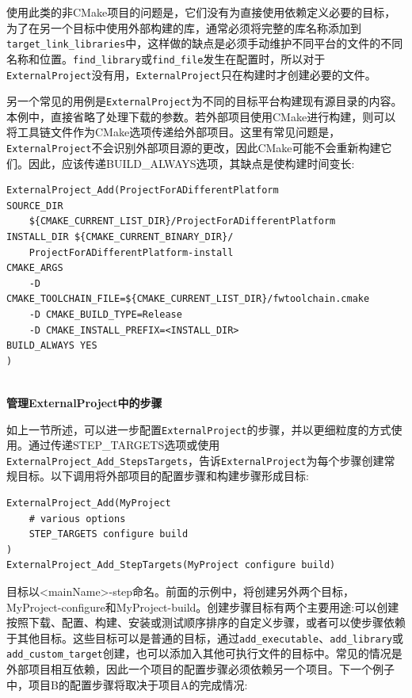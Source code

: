 使用此类的非CMake项目的问题是，它们没有为直接使用依赖定义必要的目标，为了在另一个目标中使用外部构建的库，通常必须将完整的库名称添加到\texttt{target\_link\_libraries}中，这样做的缺点是必须手动维护不同平台的文件的不同名称和位置。\texttt{find\_library}或\texttt{find\_file}发生在配置时，所以对于\texttt{ExternalProject}没有用，\texttt{ExternalProject}只在构建时才创建必要的文件。

另一个常见的用例是\texttt{ExternalProject}为不同的目标平台构建现有源目录的内容。本例中，直接省略了处理下载的参数。若外部项目使用CMake进行构建，则可以将工具链文件作为CMake选项传递给外部项目。这里有常见问题是，\texttt{ExternalProject}不会识别外部项目源的更改，因此CMake可能不会重新构建它们。因此，应该传递BUILD\_ALWAYS选项，其缺点是使构建时间变长:

\begin{lstlisting}[style=styleCMake]
ExternalProject_Add(ProjectForADifferentPlatform
SOURCE_DIR 
	${CMAKE_CURRENT_LIST_DIR}/ProjectForADifferentPlatform
INSTALL_DIR ${CMAKE_CURRENT_BINARY_DIR}/
	ProjectForADifferentPlatform-install
CMAKE_ARGS
	-D CMAKE_TOOLCHAIN_FILE=${CMAKE_CURRENT_LIST_DIR}/fwtoolchain.cmake
	-D CMAKE_BUILD_TYPE=Release
	-D CMAKE_INSTALL_PREFIX=<INSTALL_DIR>
BUILD_ALWAYS YES
)
\end{lstlisting}

\hspace*{\fill} \\ %
\noindent
\textbf{管理ExternalProject中的步骤}

如上一节所述，可以进一步配置\texttt{ExternalProject}的步骤，并以更细粒度的方式使用。通过传递STEP\_TARGETS选项或使用\texttt{ExternalProject\_Add\_StepsTargets}，告诉\texttt{ExternalProject}为每个步骤创建常规目标。以下调用将外部项目的配置步骤和构建步骤形成目标:

\begin{lstlisting}[style=styleCMake]
ExternalProject_Add(MyProject
	# various options
	STEP_TARGETS configure build
)
ExternalProject_Add_StepTargets(MyProject configure build)
\end{lstlisting}

目标以<mainName>-step命名。前面的示例中，将创建另外两个目标，MyProject-configure和MyProject-build。创建步骤目标有两个主要用途:可以创建按照下载、配置、构建、安装或测试顺序排序的自定义步骤，或者可以使步骤依赖于其他目标。这些目标可以是普通的目标，通过\texttt{add\_executable}、\texttt{add\_library}或\texttt{add\_custom\_target}创建，也可以添加入其他可执行文件的目标中。常见的情况是外部项目相互依赖，因此一个项目的配置步骤必须依赖另一个项目。下一个例子中，项目B的配置步骤将取决于项目A的完成情况:
 
